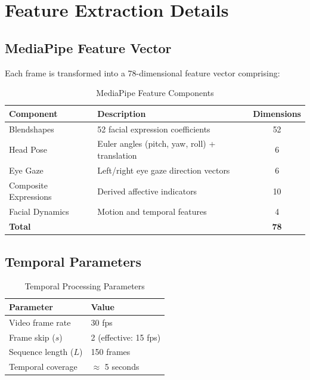 \documentclass{article}
\begin{document}
\section{Feature Extraction Details}

\subsection{MediaPipe Feature Vector}

Each frame is transformed into a 78-dimensional feature vector comprising:

\begin{table}[h]
\centering
\caption{MediaPipe Feature Components}
\label{tab:features}
\begin{tabular}{@{}llc@{}}
\toprule
\textbf{Component} & \textbf{Description} & \textbf{Dimensions} \\
\midrule
Blendshapes & 52 facial expression coefficients & 52 \\
Head Pose & Euler angles (pitch, yaw, roll) + translation & 6 \\
Eye Gaze & Left/right eye gaze direction vectors & 6 \\
Composite Expressions & Derived affective indicators & 10 \\
Facial Dynamics & Motion and temporal features & 4 \\
\midrule
\textbf{Total} & & \textbf{78} \\
\bottomrule
\end{tabular}
\end{table}

\subsection{Temporal Parameters}

\begin{table}[h]
\centering
\caption{Temporal Processing Parameters}
\label{tab:temporal}
\begin{tabular}{@{}ll@{}}
\toprule
\textbf{Parameter} & \textbf{Value} \\
\midrule
Video frame rate & 30 fps \\
Frame skip ($s$) & 2 (effective: 15 fps) \\
Sequence length ($L$) & 150 frames \\
Temporal coverage & $\approx$ 5 seconds \\
\bottomrule
\end{tabular}
\end{table}
\end{document}
